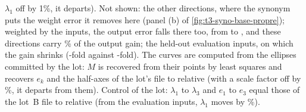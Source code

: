 {$\lambda_1$ off by 1\%, it departs). Not shown: the \LatNuageAutresDirections{} other directions, where the synonym
puts the weight error it removes here (panel (b) of \cref{fig:t3-syno-base-propre}); weighted by the inputs, the output error falls there
too, from \LatNuageAutresF{} to \LatNuageAutresS, and these directions carry \LatNuageAutresPartGain\% of the output
gain; the held-out evaluation inputs, on which the gain shrinks (\LatSpecEvalRapport-fold against \LatSpecCalibRapport-fold). The curves are computed from the ellipses
committed by the lot: $M$ is recovered from their \LatNuageEllipsePoints{} points by least squares and recovers $e_k$ and the half-axes of
the lot's file to \LatNuageAppuiTemoin{} relative (with a scale factor off by \LatNuageCasseF\%, it departs from them). Control of the
lot: $\lambda_1$ to $\lambda_3$ and $e_1$ to $e_3$ equal those of the lot~B file to \LatNuageTemoin{} relative (from
the evaluation inputs, $\lambda_1$ moves by \LatNuageCassure\%).}%
